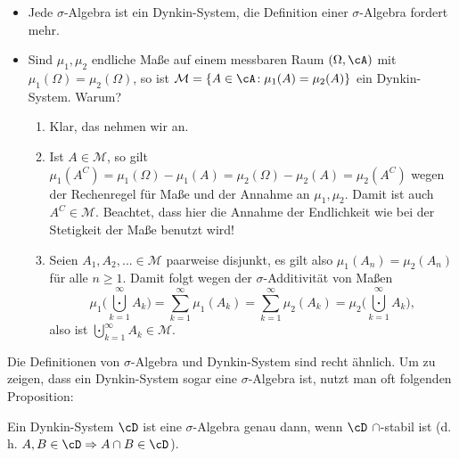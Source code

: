 \begin{beispiel} 
	\abs
	\begin{itemize}
		\item Jede $\sigma$-Algebra ist ein Dynkin-System, die Definition einer $\sigma$-Algebra fordert mehr.
		\item Sind $\mu_1,\mu_2$ endliche Maße auf einem messbaren Raum $(\Omega, \cA)$ mit $\mu_1(\Omega) = \mu_2(\Omega)$, so ist $\mathcal M = \{ A\in \cA \! : \mu_1(A) = \mu_2(A) \}$ ein Dynkin-System. Warum? \begin{enumerate}[label=(\roman*)]
			\item Klar, das nehmen wir an.
			\item Ist $A\in \mathcal M$, so gilt $\mu_1(A^C) = \mu_1(\Omega) - \mu_1(A) = \mu_2(\Omega) - \mu_2(A) = \mu_2(A^C)$ wegen der Rechenregel f\"ur Ma\ss e und der Annahme an $\mu_1, \mu_2$. Damit ist auch $A^C\in \mathcal M$. Beachtet, dass hier die Annahme der Endlichkeit wie bei der Stetigkeit der Ma\ss e benutzt wird!
			\item Seien $A_1,A_2,...\in \mathcal M$ paarweise disjunkt, es gilt also $\mu_1(A_n) = \mu_2(A_n)$ f\"ur alle $n \geq 1$. Damit folgt wegen der $\sigma$-Additivit\"at von Ma\ss en \[ \mu_1\Big({\bigcupdot\limits_{k=1}^\infty} A_k\Big) =\sum_{k=1}^{\infty} \mu_1(A_k) = \sum_{k=1}^{\infty} \mu_2(A_k) = \mu_2\Big({\bigcupdot\limits_{k=1}^\infty} A_k\Big), \] also ist $\bigcupdot\limits_{k=1}^{\infty} A_k \in \mathcal M$.
		\end{enumerate}
	\end{itemize}
\end{beispiel}
Die Definitionen von $\sigma$-Algebra und Dynkin-System sind recht \"ahnlich. Um zu zeigen, dass ein Dynkin-System sogar eine $\sigma$-Algebra ist, nutzt man oft folgenden Proposition:
\begin{prop}\label{dschnitt} 
	Ein Dynkin-System $\cD$ ist eine $\sigma$-Algebra genau dann, wenn $\cD$ $\cap$-stabil ist (d. h. $A,B \in \cD \Rightarrow A \cap B \in \cD$).
\end{prop}

